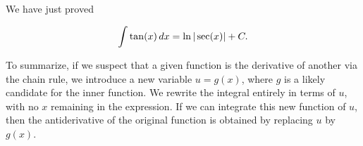 \documentclass{ximera}
\begin{document}
We have just proved

\begin{theorem}
\[
\int \tan(x) \mathop{}\!d x = \ln|\sec(x)| + C.
\]
\end{theorem}


To summarize, if we suspect that a given function is the derivative of
another via the chain rule, we introduce a new variable $u=g(x)$, where $g$ is a likely candidate for
the inner function. We rewrite the integral
 entirely in terms of $u$, with no $x$ remaining in the
expression. If we can integrate this new function of $u$, then the
antiderivative of the original function is obtained by replacing $u$
by $g(x)$.
\end{document}
